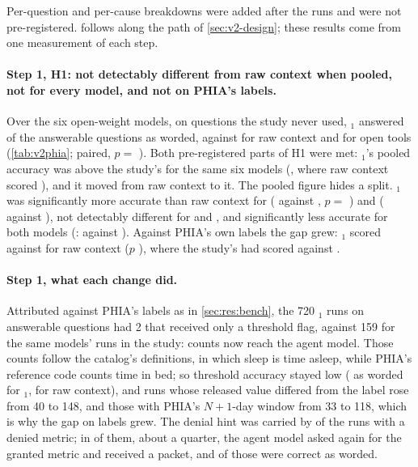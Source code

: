 Per-question and per-cause breakdowns were added after the runs and were not pre-registered.  follows
\sys{} along the path of \cref{sec:v2-design}; these results come from one measurement of each step.

\paragraph{Step 1, H1: not detectably different from raw context when pooled, not for every model, and not on PHIA's
labels.} Over the six open-weight models, on questions the study never used, \CC{}$_1$ answered \vtwoWordedPooledC{}
\vtwoWordedPooledCIC{} of the answerable questions as worded, against \vtwoWordedPooledA{} \vtwoWordedPooledCIA{} for
raw context and \vtwoWordedPooledB{} \vtwoWordedPooledCIB{} for open tools (\cref{tab:v2phia}; paired, $p=$
\vtwoPooledMcn{}). Both pre-registered parts of H1 were met: \CC{}$_1$'s pooled
accuracy was above the study's \CC{} for the same six models (\vtwoStudyWordedC{}, where raw context scored
\vtwoStudyWordedA{}), and it moved from \vtwoGapStudy{} raw context to \vtwoGapNew{} it. The pooled figure
hides a split. \CC{}$_1$ was significantly more accurate than raw context for 
(\vtwoWordedLlamaThreeC{} against \vtwoWordedLlamaThreeA{}, $p=$ \vtwoMcnLlamaThree{}) and 
(\vtwoWordedLlamaScoutC{} against \vtwoWordedLlamaScoutA{}), not detectably different for  and
, and significantly less accurate for both  models (:
\vtwoWordedOssLargeC{} against \vtwoWordedOssLargeA{}). Against PHIA's own labels the gap grew: \CC{}$_1$ scored
\vtwoLabelPooledC{} against \vtwoLabelPooledA{} for raw context ($p$ \vtwoLabelPooledMcn{}), where the study's \CC{} had
scored \vtwoStudyLabelC{} against \vtwoStudyLabelA{}.

\paragraph{Step 1, what each change did.} Attributed against PHIA's labels as in \cref{sec:res:bench}, the
720 \CC{}$_1$ runs on answerable questions had 2 that received only a threshold flag, against 159 for the same models'
\CC{} runs in the study: counts now reach the agent model. Those counts follow the catalog's definitions, in which
sleep is time asleep, while PHIA's reference code counts time in bed; so threshold accuracy stayed low
(\vtwoThrAcc{} as worded for \CC{}$_1$, \vtwoThrAccA{} for raw context), and runs whose released value differed from the
label rose from 40 to 148, and those with PHIA's $N{+}1$-day window from 33 to 118, which is why the gap on labels
grew. The denial hint was carried by \vtwoDeniedWithAlt{} of the \vtwoDeniedRuns{} runs with a denied metric; in
\vtwoDeniedFollowed{} of them, about a quarter, the agent model asked again for the granted metric and received a
packet, and \vtwoDeniedFollowedCorrect{} of those were correct as worded.

